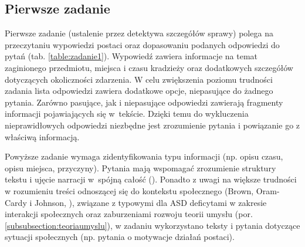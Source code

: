     \subsection{Pierwsze zadanie}
    
    Pierwsze zadanie (ustalenie przez detektywa szczegółów sprawy) polega na przeczytaniu wypowiedzi postaci oraz dopasowaniu podanych odpowiedzi do pytań (tab. \ref{table:zadanie1}).
    Wypowiedź zawiera informacje na temat zaginionego przedmiotu, miejsca i czasu kradzieży oraz dodatkowych szczegółów dotyczących okoliczności zdarzenia.
    W celu zwiększenia poziomu trudności zadania lista odpowiedzi zawiera dodatkowe opcje, niepasujące do żadnego pytania.
    Zarówno pasujące, jak i niepasujące odpowiedzi zawierają fragmenty informacji pojawiających się w~tekście.
    Dzięki temu do wykluczenia nieprawidłowych odpowiedzi niezbędne jest zrozumienie pytania i powiązanie go z właściwą informacją.
    
    Powyższe zadanie wymaga zidentyfikowania typu informacji (np. opisu czasu, opisu miejsca, przyczyny).
    Pytania mają wspomagać zrozumienie struktury tekstu i ujęcie narracji w~spójną całość (\cite{gately2008facilitating}).
    Ponadto z uwagi na większe trudności w rozumieniu treści odnoszącej się do kontekstu społecznego (Brown, Oram-Cardy i Johnson, \cite*{brown2013meta}), związane z typowymi dla ASD deficytami w zakresie interakcji społecznych oraz zaburzeniami rozwoju teorii umysłu (por. \ref{subsubsection:teoriaumyslu}), w zadaniu wykorzystano teksty i pytania dotyczące sytuacji społecznych (np. pytania o motywacje działań postaci).
    
